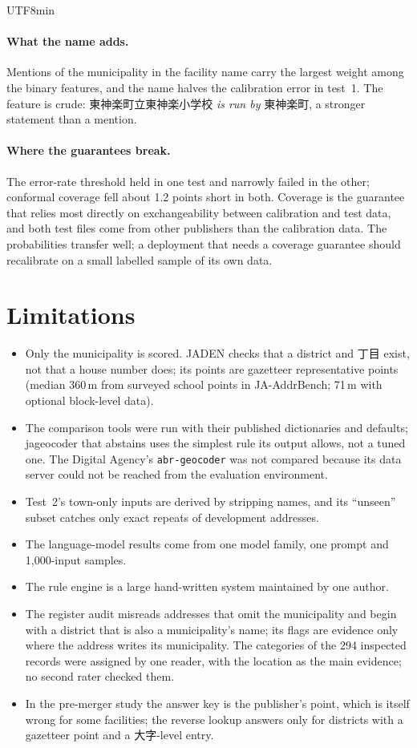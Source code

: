 \documentclass[10pt]{article}
\begin{document}
\begin{CJK}{UTF8}{min}
\paragraph{What the name adds.} Mentions of the municipality in the facility name carry the largest
weight among the binary features, and the name halves the calibration error in test~1. The feature is
crude: 東神楽町立東神楽小学校 \emph{is run by} 東神楽町, a stronger statement than a mention.

\paragraph{Where the guarantees break.} The error-rate threshold held in one test and narrowly failed in
the other; conformal coverage fell about 1.2 points short in both. Coverage is the guarantee that relies
most directly on exchangeability between calibration and test data, and both test files come from other
publishers than the calibration data. The probabilities transfer well; a deployment that needs a coverage
guarantee should recalibrate on a small labelled sample of its own data.

\section{Limitations}
\begin{itemize}
\item Only the municipality is scored. JADEN checks that a district and 丁目 exist, not that a house number
does; its points are gazetteer representative points (median 360\,m from surveyed school points in
JA-AddrBench; 71\,m with optional block-level data).
\item The comparison tools were run with their published dictionaries and defaults; jageocoder that
abstains uses the simplest rule its output allows, not a tuned one. The Digital Agency's
\texttt{abr-geocoder} was not compared because its data server could not be reached from the evaluation
environment.
\item Test~2's town-only inputs are derived by stripping names, and its ``unseen'' subset catches only exact
repeats of development addresses.
\item The language-model results come from one model family, one prompt and 1,000-input samples.
\item The rule engine is a large hand-written system maintained by one author.
\item The register audit misreads addresses that omit the municipality and begin with a district that is
also a municipality's name; its flags are evidence only where the address writes its municipality. The
categories of the 294 inspected records were assigned by one reader, with the location as the main
evidence; no second rater checked them.
\item In the pre-merger study the answer key is the publisher's point, which is itself wrong for some
facilities; the reverse lookup answers only for districts with a gazetteer point and a 大字-level entry.
\end{itemize}


\end{CJK}
\end{document}
